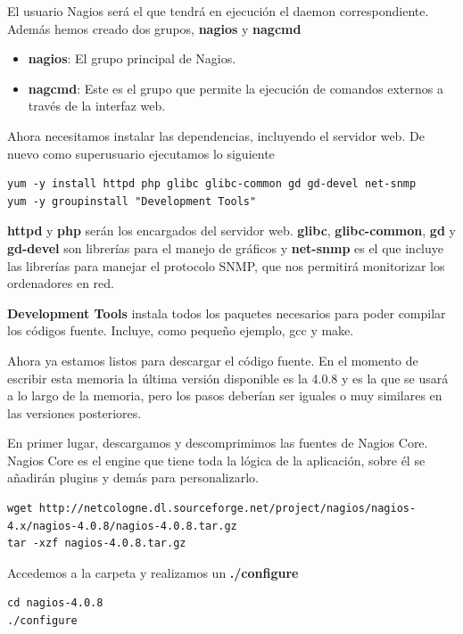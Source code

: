 \documentclass[11pt,a4paper]{article}
\begin{document}
El usuario Nagios será el que tendrá en ejecución el daemon correspondiente. Además hemos creado dos grupos, \textbf{nagios} y \textbf{nagcmd}

\begin{itemize}
\item \textbf{nagios}: El grupo principal de Nagios.
\item \textbf{nagcmd}: Este es el grupo que permite la ejecución de comandos externos a través de la interfaz web.
\end{itemize}

Ahora necesitamos instalar las dependencias, incluyendo el servidor web. De nuevo como superusuario ejecutamos lo siguiente

\begin{verbatim}
yum -y install httpd php glibc glibc-common gd gd-devel net-snmp
yum -y groupinstall "Development Tools"
\end{verbatim}

\textbf{httpd} y \textbf{php} serán los encargados del servidor web. \textbf{glibc}, \textbf{glibc-common}, \textbf{gd} y \textbf{gd-devel} son librerías para el manejo de gráficos y \textbf{net-snmp} es el que incluye las librerías para manejar el protocolo SNMP, que nos permitirá monitorizar los ordenadores en red.

\textbf{Development Tools} instala todos los paquetes necesarios para poder compilar los códigos fuente. Incluye, como pequeño ejemplo, gcc y make.

Ahora ya estamos listos para descargar el código fuente. En el momento de escribir esta memoria la última versión disponible es la 4.0.8 y es la que se usará a lo largo de la memoria, pero los pasos deberían ser iguales o muy similares en las versiones posteriores.

En primer lugar, descargamos y descomprimimos las fuentes de Nagios Core. Nagios Core es el engine que tiene toda la lógica de la aplicación, sobre él se añadirán plugins y demás para personalizarlo.

\begin{verbatim}
wget http://netcologne.dl.sourceforge.net/project/nagios/nagios-4.x/nagios-4.0.8/nagios-4.0.8.tar.gz
tar -xzf nagios-4.0.8.tar.gz
\end{verbatim}

Accedemos a la carpeta y realizamos un \textbf{./configure}

\begin{verbatim}
cd nagios-4.0.8
./configure
\end{verbatim}
\end{document}
